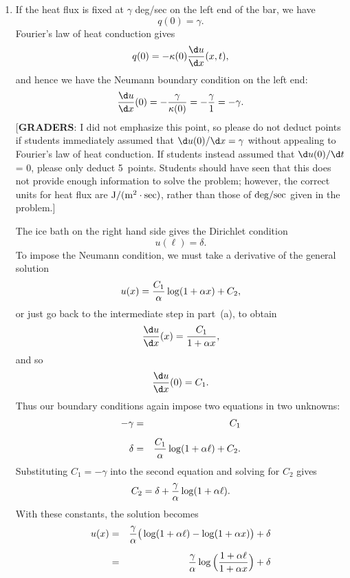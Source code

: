{\begin{solution}
\begin{enumerate}
\item  If the heat flux is fixed at $\gamma$ deg/sec on the left end of the bar,
        we have  \[ q(0) = \gamma.\]
        Fourier's law of heat conduction gives
           \[ q(0) = -\kappa(0) {\d u \over \d x}(x,t),\]
        and hence we have the Neumann boundary condition on the left end:
           \[ {\d u \over \d x}(0) = -{\gamma \over \kappa(0)} = -{\gamma \over 1} = -\gamma.\]
        [\textbf{GRADERS}: I did not emphasize this point, so please do not deduct points if
         students immediately assumed that $\d u(0)/\d x = \gamma$ without appealing to Fourier's law
         of heat conduction.  
        If students instead assumed that $\d u(0)/\d t$ = 0, please only deduct 5~points.
        Students should have seen that this does not provide enough information to solve the problem;
        however, the correct units for heat flux are ${\rm J}/({\rm m}^2\cdot {\rm sec})$, 
          rather than those of ${\rm deg}/{\rm sec}$ given in the problem.]

        The ice bath on the right hand side gives the Dirichlet condition
           \[ u(\ell) = \delta.\]
        To impose the Neumann condition, we must take a derivative of the general solution
          \[ u(x) = {C_1 \over \alpha} \log(1+\alpha x) + C_2,\]
        or just go back to the intermediate step in part~(a), to obtain
          \[ {\d u \over \d x}(x) = {C_1 \over 1+\alpha x},\]
        and so
          \[ {\d u \over \d x}(0) = {C_1}.\]
        Thus our boundary conditions again impose two equations in two unknowns:
        \begin{eqnarray*}
            -\gamma &=& C_1 \\[0.5em]
             \delta &=& {C_1\over \alpha} \log(1+\alpha \ell) + C_2.
         \end{eqnarray*}
         Substituting $C_1 = -\gamma$ into the second equation and solving for $C_2$ gives
           \[ C_2 = \delta + {\gamma \over \alpha} \log(1+\alpha \ell).\]
         With these constants, the solution becomes
           \begin{eqnarray*}
               u(x) &=& {\gamma \over \alpha} \big(\log(1+\alpha \ell) - \log (1+\alpha x)\big) + \delta \\[0.5em]
                    &=& {\gamma \over \alpha} \log\Big({1+\alpha \ell \over 1+\alpha x}\Big) + \delta  
           \end{eqnarray*} 
\end{enumerate}
\end{solution}}{}


